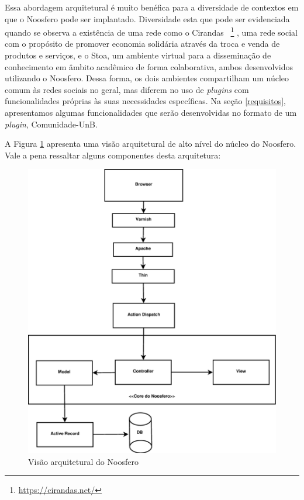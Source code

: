 Essa abordagem arquitetural é muito benéfica para a diversidade de contextos
em que o Noosfero pode ser implantado. Diversidade esta que pode ser evidenciada
quando se observa a existência de uma rede como o Cirandas
~\footnote{\url{https://cirandas.net/}}
, uma rede social com o propósito de promover economia solidária através
da troca e venda de produtos e serviços, e o
Stoa, um ambiente virtual para a disseminação de conhecimento em âmbito
acadêmico de forma colaborativa, ambos desenvolvidos utilizando o Noosfero.
Dessa forma, os dois ambientes compartilham um núcleo comum às redes sociais
no geral, mas diferem no uso de \textit{plugins} com funcionalidades próprias
às suas necessidades específicas. Na seção \ref{requisitos}, apresentamos
algumas funcionalidades que serão desenvolvidas no formato de um \textit{plugin},
Comunidade-UnB.



A Figura \ref{noosfero-arch} apresenta uma visão arquitetural de alto nível
do núcleo do Noosfero. Vale a pena ressaltar alguns componentes desta arquitetura:

\begin{figure}[h]
	\centering
	\includegraphics[keepaspectratio=true,scale=0.25]
	  {figuras/noosfero_architeture.eps}
	\caption{Visão arquitetural do Noosfero}
	\label{noosfero-arch}
\end{figure}

